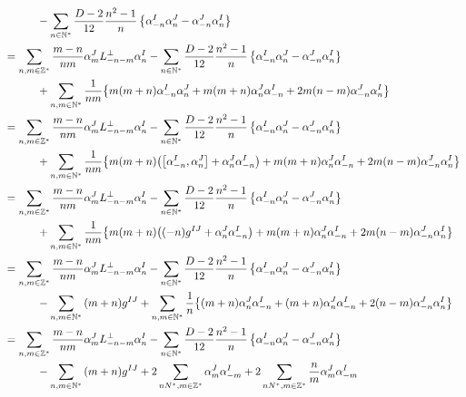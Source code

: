 \begin{align*}
    &\quad\quad\quad-\sum\limits_{n\in\mathbb N^\ast}\frac{D-2}{12}\frac{n^2-1}n\left\{\alpha_{-n}^I\alpha_n^J-\alpha_{-n}^J\alpha^I_n\right\}\\
    &=\sum\limits_{n,m\in\mathbb Z^\ast}\frac{m-n}{nm}\alpha^J_mL^\perp_{-n-m}\alpha^I_n-\sum\limits_{n\in\mathbb N^\ast}\frac{D-2}{12}\frac{n^2-1}n\left\{\alpha_{-n}^I\alpha_n^J-\alpha_{-n}^J\alpha^I_n\right\}\\
    &\quad\quad\quad+\sum\limits_{n,m\in\mathbb N^\ast}\frac{1}{nm}\qty{m\qty(m+n)\alpha_{-n}^I\alpha^J_n+m\qty(m+n)\alpha^J_n\alpha^I_{-n}+2m\qty(n-m)\alpha^J_{-n}\alpha^I_n}\\
    &=\sum\limits_{n,m\in\mathbb Z^\ast}\frac{m-n}{nm}\alpha^J_mL^\perp_{-n-m}\alpha^I_n-\sum\limits_{n\in\mathbb N^\ast}\frac{D-2}{12}\frac{n^2-1}n\left\{\alpha_{-n}^I\alpha_n^J-\alpha_{-n}^J\alpha^I_n\right\}\\
    &\quad\quad\quad+\sum\limits_{n,m\in\mathbb N^\ast}\frac{1}{nm}\qty{m\qty(m+n)\qty(\comm{\alpha_{-n}^I}{\alpha^J_n}+\alpha^J_n\alpha_{-n}^I)+m\qty(m+n)\alpha^J_n\alpha^I_{-n}+2m\qty(n-m)\alpha^J_{-n}\alpha^I_n}\\
    &=\sum\limits_{n,m\in\mathbb Z^\ast}\frac{m-n}{nm}\alpha^J_mL^\perp_{-n-m}\alpha^I_n-\sum\limits_{n\in\mathbb N^\ast}\frac{D-2}{12}\frac{n^2-1}n\left\{\alpha_{-n}^I\alpha_n^J-\alpha_{-n}^J\alpha^I_n\right\}\\
    &\quad\quad\quad+\sum\limits_{n,m\in\mathbb N^\ast}\frac{1}{nm}\qty{m\qty(m+n)\qty(\qty(-n)g^{IJ}+\alpha^J_n\alpha_{-n}^I)+m\qty(m+n)\alpha^J_n\alpha^I_{-n}+2m\qty(n-m)\alpha^J_{-n}\alpha^I_n}\\
    &=\sum\limits_{n,m\in\mathbb Z^\ast}\frac{m-n}{nm}\alpha^J_mL^\perp_{-n-m}\alpha^I_n-\sum\limits_{n\in\mathbb N^\ast}\frac{D-2}{12}\frac{n^2-1}n\left\{\alpha_{-n}^I\alpha_n^J-\alpha_{-n}^J\alpha^I_n\right\}\\
    &\quad\quad\quad-\sum\limits_{n,m\in\mathbb N^\ast}\qty(m+n)g^{IJ}+\sum\limits_{n,m\in\mathbb N^\ast}\frac{1}{n}\qty{\qty(m+n)\alpha^J_n\alpha_{-n}^I+\qty(m+n)\alpha^J_n\alpha^I_{-n}+2\qty(n-m)\alpha^J_{-n}\alpha^I_n}\\
    &=\sum\limits_{n,m\in\mathbb Z^\ast}\frac{m-n}{nm}\alpha^J_mL^\perp_{-n-m}\alpha^I_n-\sum\limits_{n\in\mathbb N^\ast}\frac{D-2}{12}\frac{n^2-1}n\left\{\alpha_{-n}^I\alpha_n^J-\alpha_{-n}^J\alpha^I_n\right\}\\
    &\quad\quad\quad-\sum\limits_{n,m\in\mathbb N^\ast}\qty(m+n)g^{IJ}+2\sum\limits_{n N^\ast,m\in\mathbb Z^\ast}\alpha_m^J\alpha_{-m}^I+2\sum\limits_{n N^\ast,m\in\mathbb Z^\ast}\frac{n}{m}\alpha_m^J\alpha_{-m}^I
\end{align*}

